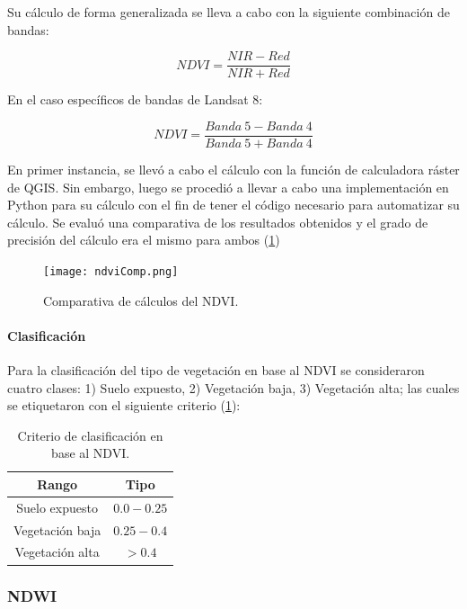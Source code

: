 Su cálculo de forma generalizada se lleva a cabo con la siguiente combinación de bandas:

$$NDVI=\frac{NIR-Red}{NIR+Red}$$

En el caso específicos de bandas de Landsat 8:

$$NDVI=\frac{Banda~5 - Banda~4}{Banda~5 + Banda~4}$$

En primer instancia, se llevó a cabo el cálculo con la función de calculadora ráster de QGIS. Sin embargo, luego se procedió a llevar a cabo una implementación en Python para su cálculo con el fin de tener el código necesario para automatizar su cálculo. Se evaluó una comparativa de los resultados obtenidos y el grado de precisión del cálculo era el mismo para ambos (\figurename \ref{fig:ndvi-comp})

\begin{figure}[H]
	\texttt{[image: ndviComp.png]}
	\centering
	\caption{Comparativa de cálculos del NDVI.}
	\label{fig:ndvi-comp}
\end{figure}

\paragraph{Clasificación} \label{clasificacion}

Para la clasificación del tipo de vegetación en base al NDVI se consideraron cuatro clases: 1) Suelo expuesto, 2) Vegetación baja, 3) Vegetación alta; las cuales se etiquetaron con el siguiente criterio (\tablename    \ref{table:ndvi-criterio}): 

\onehalfspacing
\begin{table}[H]
\begin{center}
	\begin{tabular}{|c | c |} 
		\hline
		\textbf{Rango} & \textbf{Tipo}\\
		\hline
		Suelo expuesto & $0.0-0.25$ \\
		\hline
		Vegetación baja & $0.25-0.4$ \\
		\hline
		Vegetación alta & $> 0.4$ \\
		\hline
	\end{tabular}
\end{center}
\caption{Criterio de clasificación en base al NDVI.}
\label{table:ndvi-criterio}
\end{table}
\singlespacing

\subsubsection{NDWI}


